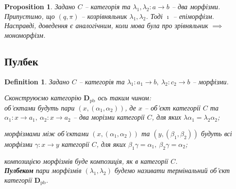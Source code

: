 \documentclass[a4paper, 10pt]{article}
\theoremstyle{theoremdd}
\newtheorem{definition}[theorem]{Definition}
\newtheorem{proposition}[theorem]{Proposition}
\begin{document}

\begin{proposition}
Задано $C$ -- категорія та $\lambda_1, \lambda_2 \colon a \to b$ -- два морфізми. Припустимо, що $(q,\pi)$ -- козрівняльник $\lambda_1,\lambda_2$. Тоді $\imath$ -- епіморфізм.\\
\textit{Насправді, доведення є аналогічним, коли мова була про зрівняльник $\implies$ мономорфізм.}
\end{proposition}

\subsection{Пулбек}
\begin{definition}
Задано $C$ -- категорія та $\lambda_1 \colon a_1 \to b,\ \lambda_2 \colon c_2 \to b$ -- морфізми.
\begin{figure}[H]
\centering
{}
\end{figure}
\noindent
Сконструюємо категорію $\textbf{D}_{\text{pb}}$ ось таким чином:\\
об'єктами будуть пари $(x,(\alpha_1,\alpha_2))$, де $x$ -- об'єкт категорії $C$ та $\alpha_1 \colon x \to a_1,\ \alpha_2 \colon x \to a_2$ -- два морізми категорії $C$, для яких $\lambda \alpha_1 = \lambda_2 \alpha_2$;
\begin{figure}[H]
\centering
{}
\end{figure}
\noindent
морфізмами між об'єктами $(x,(\alpha_1,\alpha_2))$ та $(y,(\beta_1,\beta_2))$ будуть всі морфізми $\gamma \colon x \to y$ категорії $C$, для яких $\beta_1 \gamma = \alpha_1,\ \beta_2 \gamma = \alpha_2$;
\begin{figure}[H]
\centering
{}
\end{figure}
\noindent
композицією морфізмів буде композиція, як в категорії $C$.\\
\textbf{Пулбеком} пари морфізмів $(\lambda_1,\lambda_2)$ будемо називати термінальний об'єкт категорії $\textbf{D}_{\text{pb}}$.
\end{definition}
\end{document}
